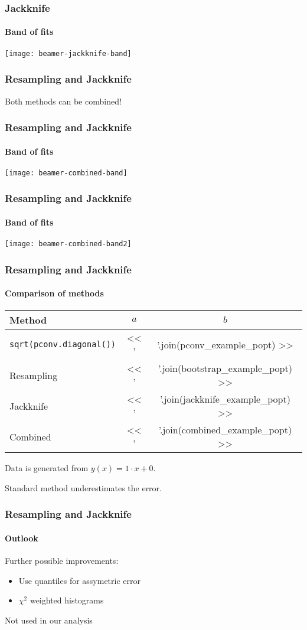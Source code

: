 \documentclass[english, fleqn]{beamer}
\begin{document}
\begin{frame}
    \frametitle{Jackknife}
    \framesubtitle{Band of fits}
    \centering
    \texttt{[image: beamer-jackknife-band]}
\end{frame}

\begin{frame}
    \frametitle{Resampling and Jackknife}

    Both methods can be combined!
\end{frame}

\begin{frame}
    \frametitle{Resampling and Jackknife}
    \framesubtitle{Band of fits}
    \centering
    \texttt{[image: beamer-combined-band]}
\end{frame}

\begin{frame}
    \frametitle{Resampling and Jackknife}
    \framesubtitle{Band of fits}
    \centering
    \texttt{[image: beamer-combined-band2]}
\end{frame}

\begin{frame}
    \frametitle{Resampling and Jackknife}
    \framesubtitle{Comparison of methods}
    {
        \centering
        \begin{tabular}{lSS}
            \toprule
            {Method}
            & {$a$}
            & {$b$}
            \\
            \midrule
            \texttt{sqrt(pconv.diagonal())} & << ' & '.join(pconv_example_popt) >> \\
            Resampling & << ' & '.join(bootstrap_example_popt) >> \\
            Jackknife & << ' & '.join(jackknife_example_popt) >> \\
            Combined & << ' & '.join(combined_example_popt) >> \\
            \bottomrule
        \end{tabular}
    }

    \pause

    Data is generated from $y(x) = 1 \cdot x + 0$.

    \pause

    Standard method underestimates the error.

\end{frame}

\begin{frame}
    \frametitle{Resampling and Jackknife}
    \framesubtitle{Outlook}

    Further possible improvements:

    \begin{itemize}
        \item Use quantiles for assymetric error
        \item $\chi^2$ weighted histograms
    \end{itemize}

    \pause

    Not used in our analysis
\end{frame}
\end{document}
